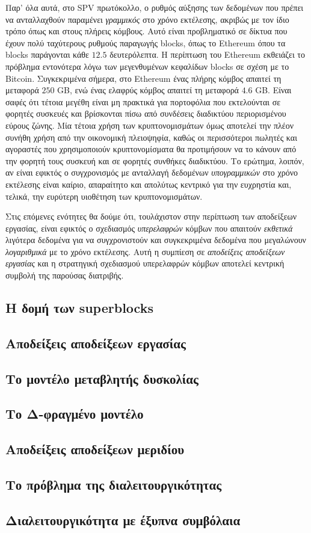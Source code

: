 Παρ' όλα αυτά, στο SPV πρωτόκολλο,
ο ρυθμός αύξησης των δεδομένων που πρέπει να ανταλλαχθούν παραμένει \emph{γραμμικός} στο χρόνο εκτέλεσης,
ακριβώς με τον ίδιο τρόπο όπως και στους πλήρεις κόμβους. Αυτό είναι προβληματικό σε δίκτυα που έχουν πολύ ταχύτερους
ρυθμούς παραγωγής blocks, όπως το Ethereum όπου τα blocks παράγονται κάθε $12.5$ δευτερόλεπτα.
Η περίπτωση του Ethereum εκθειάζει το πρόβλημα εντονότερα λόγω των μεγενθυμένων κεφαλίδων blocks σε σχέση
με το Bitcoin. Συγκεκριμένα σήμερα, στο Ethereum ένας πλήρης κόμβος απαιτεί τη μεταφορά $250$ GB, ενώ ένας
ελαφρύς κόμβος απαιτεί τη μεταφορά $4.6$ GB. Είναι σαφές ότι τέτοια μεγέθη είναι μη πρακτικά για πορτοφόλια που
εκτελούνται σε φορητές συσκευές και βρίσκονται πίσω από συνδέσεις διαδικτύου περιορισμένου εύρους ζώνης.
Μία τέτοια χρήση των κρυπτονομισμάτων όμως αποτελεί την πλέον συνήθη χρήση από την οικονομική πλειοψηφία,
καθώς οι περισσότεροι πωλητές και αγοραστές που χρησιμοποιούν κρυπτονομίσματα θα προτιμήσουν να το κάνουν
από την φορητή τους συσκευή και σε φορητές συνθήκες διαδικτύου. Το ερώτημα, λοιπόν, αν είναι εφικτός ο
συγχρονισμός με ανταλλαγή δεδομένων \emph{υπογραμμικών} στο χρόνο εκτέλεσης είναι καίριο, απαραίτητο και
απολύτως κεντρικό για την ευχρηστία και, τελικά, την ευρύτερη υιοθέτηση των κρυπτονομισμάτων.

Στις επόμενες ενότητες θα δούμε ότι, τουλάχιστον στην περίπτωση των αποδείξεων εργασίας,
είναι εφικτός ο σχεδιασμός \emph{υπερελαφρών} κόμβων που απαιτούν
\emph{εκθετικά} λιγότερα δεδομένα για να συγχρονιστούν και συγκεκριμένα δεδομένα που μεγαλώνουν
\emph{λογαριθμικά} με το χρόνο εκτέλεσης. Αυτή η συμπίεση σε \emph{αποδείξεις αποδείξεων εργασίας}
και η στρατηγική σχεδιασμού υπερελαφρών κόμβων αποτελεί κεντρική συμβολή της παρούσας διατριβής.

\subsection*{Η δομή των superblocks}
\subsection*{Αποδείξεις αποδείξεων εργασίας}
\subsection*{Το μοντέλο μεταβλητής δυσκολίας}
\subsection*{Το Δ-φραγμένο μοντέλο}
\subsection*{Αποδείξεις αποδείξεων μεριδίου}
\subsection*{Το πρόβλημα της διαλειτουργικότητας}
\subsection*{Διαλειτουργικότητα με έξυπνα συμβόλαια}

\clearpage
\fi
